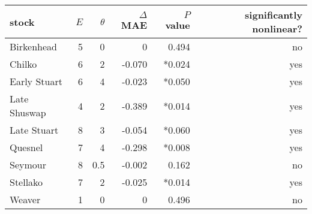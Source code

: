 \begin{tabular}{lrrrrr}
\hline
stock & $E$ & $\theta$ & $\Delta$MAE & $P$ value & significantly nonlinear? \\
\hline
Birkenhead & 5 & 0 & 0 & 0.494 & no \\
Chilko & 6 & 2 & -0.070 & *0.024 & yes \\
Early Stuart & 6 & 4 & -0.023 & *0.050 & yes \\
Late Shuswap & 4 & 2 & -0.389 & *0.014 & yes \\
Late Stuart & 8 & 3 & -0.054 & *0.060 & yes \\
Quesnel & 7 & 4 & -0.298 & *0.008 & yes \\
Seymour & 8 & 0.5 & -0.002 & 0.162 & no \\
Stellako & 7 & 2 & -0.025 & *0.014 & yes \\
Weaver & 1 & 0 & 0 & 0.496 & no \\
\hline
\end{tabular}